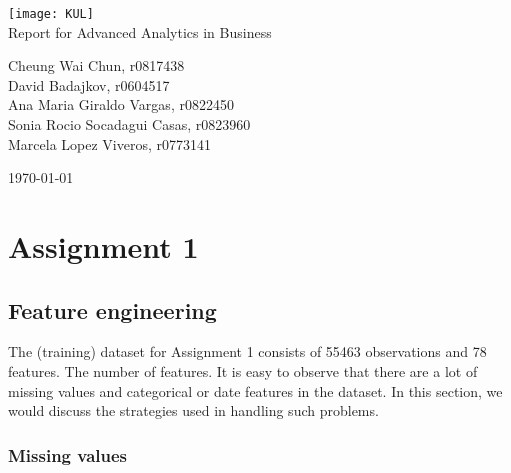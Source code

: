 \documentclass[12pt]{article}
\begin{document}
\begin{titlepage}
	\begin{center}
	\vspace*{1cm}
    \texttt{[image: KUL]}\\
	\vspace{2.5cm}
    {\Large Report for Advanced Analytics in Business}
            
    \vspace{1.5cm}

    {\large Cheung Wai Chun, r0817438}\\
    \vspace{0.5cm}
    {\large David Badajkov, r0604517}\\
    \vspace{0.5cm}
    {\large Ana Maria Giraldo Vargas, r0822450}\\
    \vspace{0.5cm}
	{\large Sonia Rocio 	Socadagui Casas, r0823960}\\
	\vspace{0.5cm}
	{\large Marcela 	Lopez Viveros, r0773141}
	\vspace{1.5cm}

       \today
   \end{center}
\end{titlepage}

\newpage
\tableofcontents
\newpage

\section*{Assignment 1}


\subsection*{Feature engineering}

The (training) dataset for Assignment 1 consists of 55463 observations and 78 features. The number of features. It is easy to observe that there are a lot of missing values and categorical or date features in the dataset. In this section, we would discuss the strategies used in handling such problems. 

\subsubsection*{Missing values}
\end{document}

